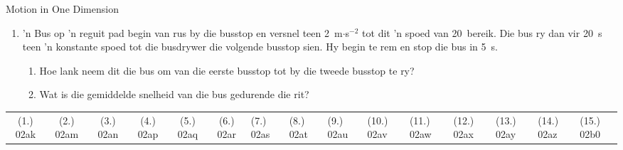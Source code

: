 \begin{eocexercises}{Motion in One Dimension}
\begin{enumerate}[noitemsep, label=\textbf{\arabic*}. ]
    \item 'n Bus op 'n reguit pad begin van rus by die busstop en versnel teen 2~m$\cdot$s$^{-2}$ tot dit 'n spoed van 20~\ms bereik. Die bus ry dan vir 20~s teen 'n konstante spoed tot die busdrywer die volgende busstop sien. Hy begin te rem en stop die bus in 5~s.
    \begin{enumerate}
    \item Hoe lank neem dit die bus om van die eerste busstop tot by die tweede busstop te ry?
    \item Wat is die gemiddelde snelheid van die bus gedurende die rit?
    \end{enumerate}
    \end{enumerate}
\practiceinfo
     \par \begin{tabular}[h]{cccccc}
     (1.) 02ak  &  (2.) 02am  &  (3.) 02an  &  (4.) 02ap  &  (5.) 02aq  &  (6.) 02ar  & (7.) 02as & (8.) 02at & (9.) 02au & (10.) 02av &
    (11.) 02aw & (12.) 02ax & (13.) 02ay & (14.) 02az & (15.) 02b0
     \end{tabular}
\end{eocexercises}
